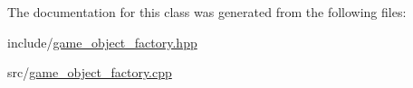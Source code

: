 The documentation for this class was generated from the following files\+:\begin{DoxyCompactItemize}
\item 
include/\hyperlink{game__object__factory_8hpp}{game\+\_\+object\+\_\+factory.\+hpp}\item 
src/\hyperlink{game__object__factory_8cpp}{game\+\_\+object\+\_\+factory.\+cpp}\end{DoxyCompactItemize}

